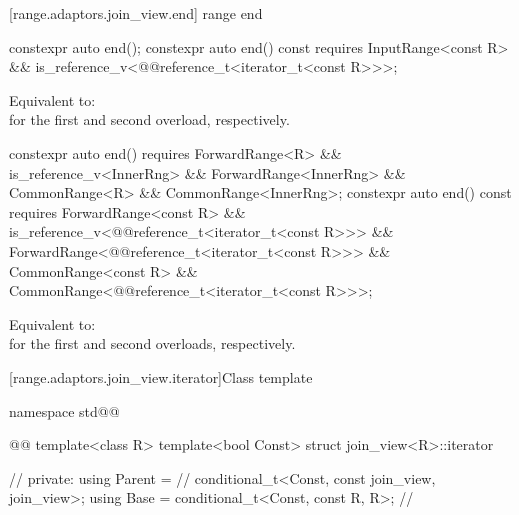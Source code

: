 {[range.adaptors.join_view.end]{ range end}

%
\begin{itemdecl}
constexpr auto end();
constexpr auto end() const requires InputRange<const R> &&
  is_reference_v<@@reference_t<iterator_t<const R>>>;
\end{itemdecl}

\begin{itemdescr}
\pnum
\effects Equivalent to:  \\
for the first and second overload, respectively.
\end{itemdescr}

%
\begin{itemdecl}
constexpr auto end() requires ForwardRange<R> &&
  is_reference_v<InnerRng> && ForwardRange<InnerRng> &&
  CommonRange<R> && CommonRange<InnerRng>;
constexpr auto end() const requires ForwardRange<const R> &&
  is_reference_v<@@reference_t<iterator_t<const R>>> &&
  ForwardRange<@@reference_t<iterator_t<const R>>> &&
  CommonRange<const R> && CommonRange<@@reference_t<iterator_t<const R>>>;
\end{itemdecl}

\begin{itemdescr}
\pnum
\effects Equivalent to:
 \\
for the first and second overloads, respectively.
\end{itemdescr}

[range.adaptors.join_view.iterator]{Class template }

\pnum
{}

\begin{codeblock}
namespace std@@ { @@
template<class R>
  template<bool Const>
  struct join_view<R>::iterator { // \expos
  private:
    using Parent =                                            // \expos
      conditional_t<Const, const join_view, join_view>;
    using Base   = conditional_t<Const, const R, R>;          // \expos

}}
\end{codeblock}}
